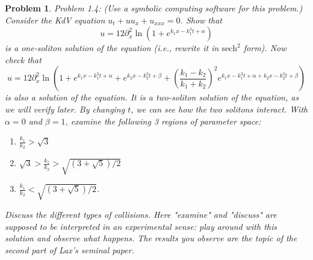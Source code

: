 \documentclass[12pt]{report}
\newtheorem{problem}{Problem}
\begin{document}
\vskip 20pt



\begin{problem}
    Problem 1.4: (Use a symbolic computing software for this problem.) Consider the KdV equation $u_t + uu_x + u_{xxx} = 0$. Show that 
    $$u = 12 \partial_x^2 \ln\left(1 + e^{k_1 x - k_1^3t + \alpha}\right)$$
    is a one-soliton solution of the equation (i.e., rewrite it in $\text{sech}^2$ form). Now check that 
    $$u = 12 \partial_x^2\ln\left(1 + e^{k_1 x - k_1^3t + \alpha} + e^{k_2 x - k_2^3t + \beta} + \left(\frac{k_1-k_2}{k_1 + k_2}\right)^2e^{k_1x - k_1^3t + \alpha + k_2x - k_2^3t+ \beta}\right)$$ is also a solution of the equation. It is a two-soliton solution of the equation, as we will verify later. By changing $t$, we can see how the two solitons interact. With $\alpha = 0$ and $\beta = 1$, examine the following 3 regions of parameter space:
    \begin{enumerate}
        \item $\frac{k_1}{k_2} > \sqrt{3}$
        \item $\sqrt{3} > \frac{k_1}{k_2} > \sqrt{(3 + \sqrt{5})/2}$
        \item $\frac{k_1}{k_2} < \sqrt{(3 + \sqrt{5})/2}$.
    \end{enumerate}
    Discuss the different types of collisions. Here "examine" and "discuss" are supposed to be interpreted in an experimental sense: play around with this solution and observe what happens. The results you observe are the topic of the second part of Lax's seminal paper.
\end{problem}
\end{document}
